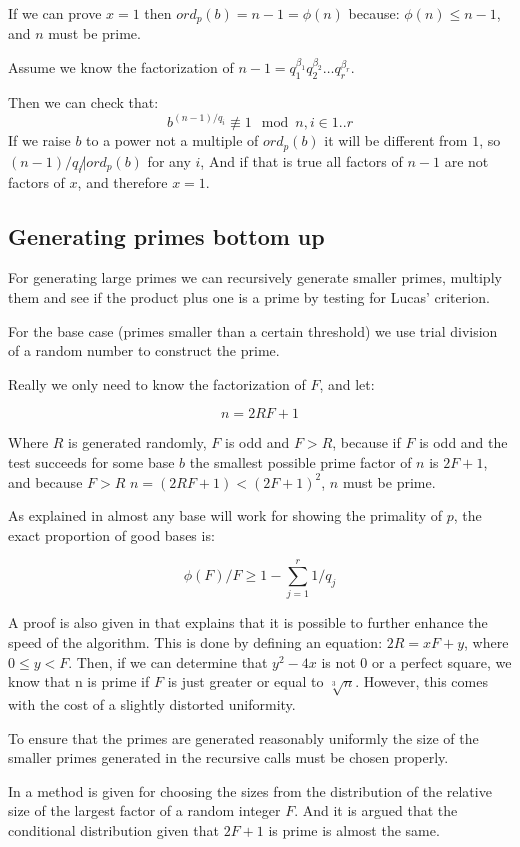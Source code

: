 \documentclass[11pt,a4paper]{article}
\begin{document}
If we can prove $x=1$ then $ord_p(b)=n-1=\phi(n)$ because: $\phi(n) \leq
n-1$, and $n$ must be prime.

Assume we know the factorization of $n-1 = q_1^{\beta_1}q_2^{\beta_2}\ldots q_r^{\beta_r}$.

Then we can check that:
\[b^{(n-1)/q_i}\not\equiv 1 \mod n, i\in{1..r}\] If we raise $b$
to a power not a multiple of $ord_p(b)$ it will be different from $1$,
so $(n-1)/q_i\not|ord_p(b)$ for any $i$, And if that is true all
factors of $n-1$ are not factors of $x$, and therefore $x=1$.
\subsection{Generating primes bottom up}
For generating large primes we can recursively generate smaller
primes, multiply them and see if the product plus one is a prime by
testing for Lucas' criterion.

For the base case (primes smaller than a certain threshold) we use
trial division of a random number to construct the prime.

Really we only need to know the factorization of $F$, and let:

\[n = 2RF+1\] 

Where $R$ is generated randomly, $F$ is odd and $F>R$, because if $F$
is odd and the test succeeds for some base $b$ the smallest possible
prime factor of $n$ is $2F+1$, and because $F>R$ $n=(2RF+1)<(2F+1)^2$,
$n$ must be prime.

As explained in \cite{DBLP:journals/joc/Maurer95} almost any base will work
for showing the primality of $p$, the exact proportion of good bases
is:

\[\phi(F)/F \geq 1-\sum^r_{j=1}1/q_j\]

A proof is also given in \cite{DBLP:journals/joc/Maurer95} that explains that
it is possible to further enhance the speed of the algorithm. This is done
by defining an equation: $2R = xF + y$, where $0\le y < F$. Then, if we can 
determine that $y^2 - 4x$ is not 0 or a perfect square, we know that n 
is prime if $F$ is just greater or equal to $\sqrt[3]{n}$. However, this
comes with the cost of a slightly distorted uniformity.

To ensure that the primes are generated reasonably uniformly the size
of the smaller primes generated in the recursive calls must be chosen
properly.

In \cite{DBLP:journals/joc/Maurer95} a method is given for choosing the sizes
from the distribution of the relative size of the largest factor of a
random integer $F$. And it is argued that the conditional distribution
given that $2F+1$ is prime is almost the same.
\end{document}
